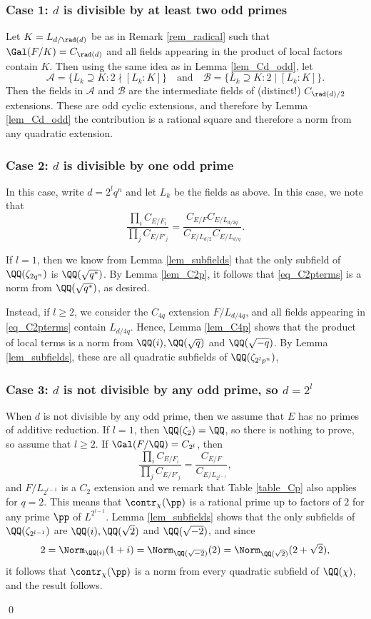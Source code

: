 \subsubsection*{Case 1: $d$ is divisible by at least two odd primes}
Let $K=L_{d/\rad(d)}$ be as in Remark \ref{rem_radical} such that $\Gal(F/K)=C_{\rad(d)}$ and all fields appearing in the product of local factors contain $K$. Then using the same idea as in Lemma \ref{lem_Cd_odd}, let 
$$\mathcal{A}=\{L_k\supseteq K:2\nmid [L_k:K]\}\quad\text{and}\quad\mathcal{B}=\{L_k\supseteq K:2\mid [L_k:K]\}.$$
Then the fields in $\mathcal{A}$ and $\mathcal{B}$ are the intermediate fields of (distinct!) $C_{\rad(d)/2}$ extensions. These are odd cyclic extensions, and therefore by Lemma \ref{lem_Cd_odd} the contribution is a rational square and therefore a norm from any quadratic extension.

\subsubsection*{Case 2: $d$ is divisible by one odd prime}
In this case, write $d=2^lq^n$ and let $L_k$ be the fields as above. In this case, we note that
\begin{equation}\label{eq_C2pterms}
    \frac{\prod_i C_{E/F_i}}{\prod_j C_{E/F'_j}}=\frac{C_{E/F}C_{E/L_{d/2q}}}{C_{E/L_{d/2}}C_{E/L_{d/q}}}.
\end{equation} 

If $l=1$, then we know from Lemma \ref{lem_subfields} that the only subfield of $\QQ(\zeta_{2q^n})$ is $\QQ(\sqrt{q^*})$. By Lemma \ref{lem_C2p}, it follows that \eqref{eq_C2pterms} is a norm from $\QQ(\sqrt{q^*})$, as desired.

Instead, if $l\geq2$, we consider the $C_{4q}$ extension $F/L_{d/4q}$, and all fields appearing in \eqref{eq_C2pterms} contain $L_{d/4q}$. Hence, Lemma \ref{lem_C4p} shows that the product of local terms is a norm from $\QQ(i), \QQ(\sqrt{q})$ and $\QQ(\sqrt{-q})$. By Lemma \ref{lem_subfields}, these are all quadratic subfields of $\QQ(\zeta_{2^lp^n})$, 

\subsubsection*{Case 3: $d$ is not divisible by any odd prime, so $d=2^l$}

When $d$ is not divisible by any odd prime, then we assume that $E$ has no primes of additive reduction. If $l=1$, then $\QQ(\zeta_2)=\QQ$, so there is nothing to prove, so assume that $l\geq2$. If $\Gal(F/\QQ)=C_{2^l}$, then 
$$\frac{\prod_i C_{E/F_i}}{\prod_j C_{E/F'_j}}=\frac{C_{E/F}}{C_{E/L_{2^{l-1}}}},$$
and $F/L_{2^{l-1}}$ is a $C_2$ extension and we remark that Table \ref{table_Cp} also applies for $q=2$. This means that $\contr_\chi(\pp)$ is a rational prime up to factors of $2$ for any prime $\pp$ of $L^{2^{l-1}}$. Lemma \ref{lem_subfields} shows that the only subfields of $\QQ(\zeta_{2^{l-1}})$ are $\QQ(i),\QQ(\sqrt{2})$ and $\QQ(\sqrt{-2})$, and since 
$$2=\Norm_{\QQ(i)}(1+i)=\Norm_{\QQ(\sqrt{-2})}(2)=\Norm_{\QQ(\sqrt{2})}(2+\sqrt{2}),$$
it follows that $\contr_\chi(\pp)$ is a norm from every quadratic subfield of $\QQ(\chi)$, and the result follows.

\qed

